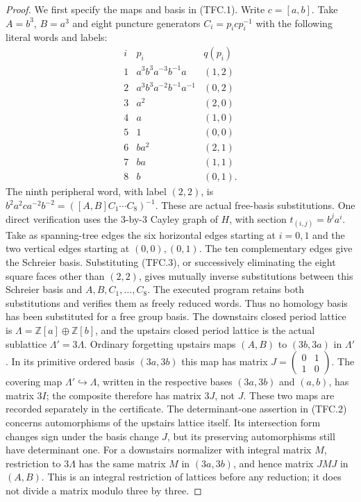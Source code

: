 \begin{proof}
We first specify the maps and basis in (TFC.1).  Write $c=[a,b]$.
Take $A=b^3$, $B=a^3$ and eight puncture generators
$C_i=p_i c p_i^{-1}$ with the following literal words and labels:
\[
\begin{array}{c|c|c}
 i&p_i&q(p_i)\\ \hline
1&a^3b^3a^{-3}b^{-1}a&(1,2)\\
2&a^3b^3a^{-2}b^{-1}a^{-1}&(0,2)\\
3&a^2&(2,0)\\
4&a&(1,0)\\
5&1&(0,0)\\
6&ba^2&(2,1)\\
7&ba&(1,1)\\
8&b&(0,1).
\end{array}                                                   \tag{TFC.3}
\]
The ninth peripheral word, with label $(2,2)$, is
$b^2a^2c a^{-2}b^{-2}=([A,B]C_1\cdots C_8)^{-1}$.
These are actual free-basis substitutions.  One direct verification
uses the $3$-by-$3$ Cayley graph of $H$, with section
$t_{(i,j)}=b^ja^i$.  Take as spanning-tree edges the six horizontal
edges starting at $i=0,1$ and the two vertical edges starting at
$(0,0),(0,1)$.  The ten complementary edges give the Schreier basis.
Substituting (TFC.3), or successively eliminating the eight square
faces other than $(2,2)$, gives mutually inverse substitutions
between this Schreier basis and $A,B,C_1,\ldots,C_8$.
The executed program retains both substitutions and verifies them
as freely reduced words.  Thus no homology basis has been substituted
for a free group basis.  The downstairs closed period lattice is
$\Lambda=\mathbb Z[a]\oplus\mathbb Z[b]$, and the upstairs closed
period lattice is the actual sublattice $\Lambda'=3\Lambda$.
Ordinary forgetting upstairs maps $(A,B)$ to $(3b,3a)$ in
$\Lambda'$.  In its primitive ordered basis $(3a,3b)$ this map has
matrix $J=\left(\begin{smallmatrix}0&1\\1&0\end{smallmatrix}\right)$.
The covering map $\Lambda'\hookrightarrow\Lambda$, written in
the respective bases $(3a,3b)$ and $(a,b)$, has matrix $3I$;
the composite therefore has matrix $3J$, not $J$.
These two maps are recorded separately in the certificate.
The determinant-one assertion in (TFC.2) concerns automorphisms
of the upstairs lattice itself.  Its intersection form changes
sign under the basis change $J$, but its preserving automorphisms
still have determinant one.  For a downstairs normalizer with
integral matrix $M$, restriction to $3\Lambda$ has the same
matrix $M$ in $(3a,3b)$, and hence matrix $J M J$ in $(A,B)$.
This is an integral restriction of lattices before any reduction;
it does not divide a matrix modulo three by three.


\end{proof}
